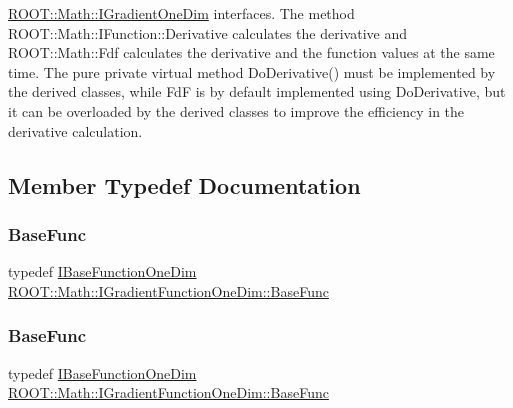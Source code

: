 \mbox{\hyperlink{classROOT_1_1Math_1_1IGradientOneDim}{R\+O\+O\+T\+::\+Math\+::\+I\+Gradient\+One\+Dim}} interfaces. The method R\+O\+O\+T\+::\+Math\+::\+I\+Function\+::\+Derivative calculates the derivative and R\+O\+O\+T\+::\+Math\+::\+Fdf calculates the derivative and the function values at the same time. The pure private virtual method Do\+Derivative() must be implemented by the derived classes, while FdF is by default implemented using Do\+Derivative, but it can be overloaded by the derived classes to improve the efficiency in the derivative calculation. 

\subsection{Member Typedef Documentation}
\mbox{\label{classROOT_1_1Math_1_1IGradientFunctionOneDim_a9eae6bcbeb2d0396937710bd70bd29d0}} 
\subsubsection{\texorpdfstring{BaseFunc}{BaseFunc}\hspace{0.1cm}{\footnotesize\ttfamily [1/2]}}
{\footnotesize\ttfamily typedef \mbox{\hyperlink{classROOT_1_1Math_1_1IBaseFunctionOneDim}{I\+Base\+Function\+One\+Dim}} \mbox{\hyperlink{classROOT_1_1Math_1_1IGradientFunctionOneDim_a9eae6bcbeb2d0396937710bd70bd29d0}{R\+O\+O\+T\+::\+Math\+::\+I\+Gradient\+Function\+One\+Dim\+::\+Base\+Func}}}

\mbox{\label{classROOT_1_1Math_1_1IGradientFunctionOneDim_a9eae6bcbeb2d0396937710bd70bd29d0}} 
\subsubsection{\texorpdfstring{BaseFunc}{BaseFunc}\hspace{0.1cm}{\footnotesize\ttfamily [2/2]}}
{\footnotesize\ttfamily typedef \mbox{\hyperlink{classROOT_1_1Math_1_1IBaseFunctionOneDim}{I\+Base\+Function\+One\+Dim}} \mbox{\hyperlink{classROOT_1_1Math_1_1IGradientFunctionOneDim_a9eae6bcbeb2d0396937710bd70bd29d0}{R\+O\+O\+T\+::\+Math\+::\+I\+Gradient\+Function\+One\+Dim\+::\+Base\+Func}}}

